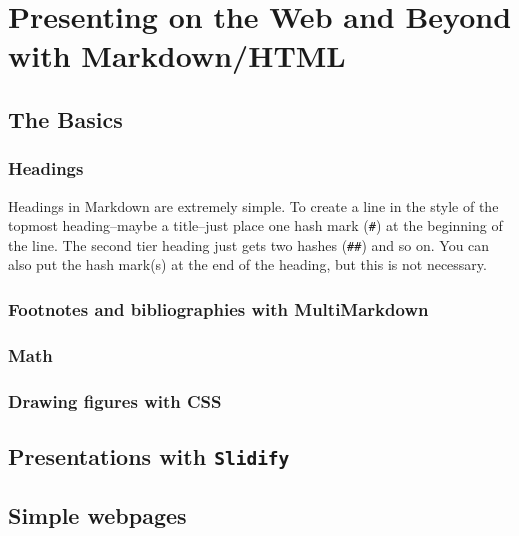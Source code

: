 



\chapter{Presenting on the Web and Beyond with Markdown/HTML}\label{MarkdownChapter}


\section{The Basics}

\subsection{Headings}

Headings in Markdown are extremely simple. To create a line in the style of the topmost heading--maybe a title--just place one hash mark (\texttt{\#}) at the beginning of the line. The second tier heading just gets two hashes (\texttt{\#\#}) and so on. You can also put the hash mark(s) at the end of the heading, but this is not necessary.

\subsection{Footnotes and bibliographies with MultiMarkdown}

\subsection{Math}

\subsection{Drawing figures with CSS}

\section{Presentations with \texttt{Slidify}}

\section{Simple webpages}

